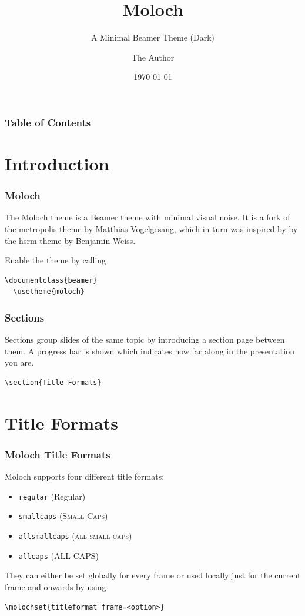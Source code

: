 \documentclass[10pt]{beamer}
\title{Moloch}
\subtitle{A Minimal Beamer Theme (Dark)}
\date{\today}
\author{The Author}
\institute{Some Institution, Some University}
\begin{document}
\UBCTitlePage[variant=dark]

\begin{frame}
  \frametitle{Table of Contents}
  \tableofcontents
\end{frame}

\section{Introduction}

\begin{frame}[fragile]
  \frametitle{Moloch}

  The Moloch theme is a Beamer theme with minimal visual noise. It is
  a fork of the
  \href{https://github.com/matze/mtheme}{metropolis theme} by
  Matthias Vogelgesang, which in
  turn was inspired by by the
  \href{https://github.com/hsrmbeamertheme/hsrmbeamertheme}{hsrm
  theme} by Benjamin Weiss. \medskip

  Enable the theme by calling
  \begin{verbatim}\documentclass{beamer}
  \usetheme{moloch}
  \end{verbatim}
\end{frame}
\begin{frame}[fragile]
  \frametitle{Sections}
  Sections group slides of the same topic by introducing a section
  page between them. A progress bar is shown which indicates how far
  along in the presentation you are.

  \begin{verbatim}\section{Title Formats}
  \end{verbatim}
\end{frame}

\section{Title Formats}

\begin{frame}[fragile]
  \frametitle{Moloch Title Formats}
  Moloch supports four different title formats:
  \begin{itemize}
    \item \texttt{regular} (Regular)
    \item \texttt{smallcaps} (\textsc{Small Caps})
    \item \texttt{allsmallcaps} (\textsc{all small caps})
    \item \texttt{allcaps} (ALL CAPS)
  \end{itemize}

  They can either be set globally for every frame or used locally
  just for the current frame
  and onwards by using
  \begin{verbatim}\molochset{titleformat frame=<option>}
  \end{verbatim}
\end{frame}
\end{document}
